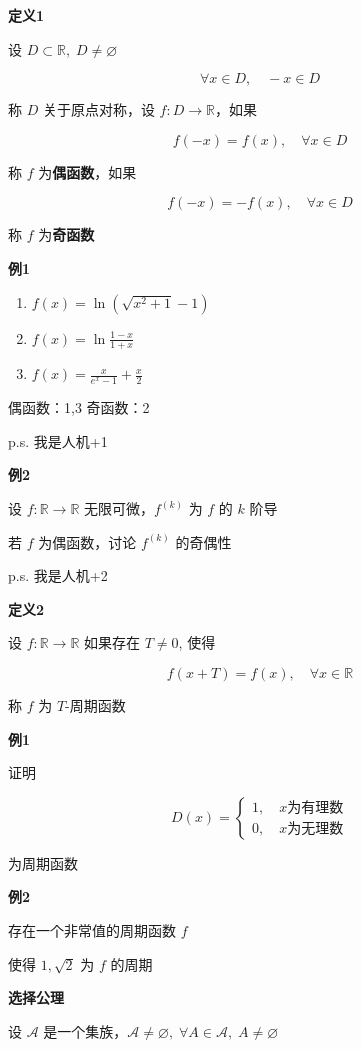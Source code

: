 \textbf{定义1}

设 \(D\subset \mathbb{R}, \; D \neq \varnothing\)

\[
\forall x \in D,\quad -x \in D
\]

称 \(D\) 关于原点对称，设 \(f: D\to \mathbb{R}\)，如果

\[
f(-x)=f(x), \quad \forall x \in D
\]

称 \(f\) 为\textbf{偶函数}，如果

\[
f(-x)=-f(x),\quad \forall x \in D
\]

称 \(f\) 为\textbf{奇函数}

\textbf{例1}

\begin{enumerate}
\def\labelenumi{\arabic{enumi}.}
\tightlist
\item
  \(f(x)=\ln\left(\sqrt{ x^{2}+1 }-1\right)\)
\item
  \(f(x)=\ln \frac{1-x}{1+x}\)
\item
  \(f(x)=\frac{x}{e^{x}-1}+\frac{x}{2}\)
\end{enumerate}

偶函数：1,3 奇函数：2

p.s. 我是人机+1

\textbf{例2}

设 \(f:\mathbb{R}\to \mathbb{R}\) 无限可微，\(f^{(k)}\) 为 \(f\) 的
\(k\) 阶导

若 \(f\) 为偶函数，讨论 \(f^{(k)}\) 的奇偶性

p.s. 我是人机+2

\textbf{定义2}

设 \(f:\mathbb{R}\to \mathbb{R}\) 如果存在 \(T\neq 0\), 使得

\[
f(x+T)=f(x), \quad \forall x \in \mathbb{R}
\]

称 \(f\) 为 \(T\)-周期函数

\textbf{例1}

证明

\[
D(x)=
\left\{
\begin{aligned}
1, \quad x为有理数\\
0, \quad x为无理数
\end{aligned}
\right.
\]

为周期函数

\textbf{例2}

存在一个非常值的周期函数 \(f\)

使得 \(1,\sqrt{ 2 }\) 为 \(f\) 的周期

\textbf{选择公理}

设 \(\mathscr{A}\)
是一个集族，\(\mathscr{A}\neq \varnothing, \; \forall A \in \mathscr{A}, \; A \neq \varnothing\)

